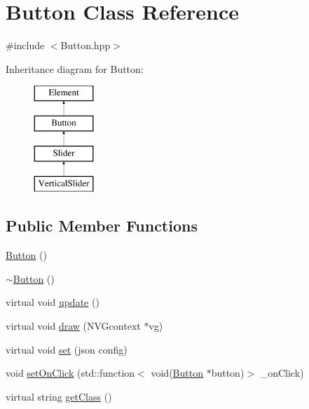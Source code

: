 \hypertarget{class_button}{}\section{Button Class Reference}
\label{class_button}


{\ttfamily \#include $<$Button.\+hpp$>$}

Inheritance diagram for Button\+:\begin{figure}[H]
\begin{center}
\leavevmode
\includegraphics[height=4.000000cm]{class_button}
\end{center}
\end{figure}
\subsection*{Public Member Functions}
\begin{DoxyCompactItemize}
\item 
\hyperlink{class_button_a3b36df1ae23c58aedb9e15a713159459}{Button} ()
\item 
\hyperlink{class_button_a2a001eb9c3cc8ae54768a850dd345002}{$\sim$\+Button} ()
\item 
virtual void \hyperlink{class_button_ad8e030c1c8846d43f3126047d4a3667f}{update} ()
\item 
virtual void \hyperlink{class_button_a3a6ae66dc1ebc663fc12f19ce5cb6840}{draw} (N\+V\+Gcontext $\ast$vg)
\item 
virtual void \hyperlink{class_button_a6e7c3b800fae0b1e7765ccdafc88c28e}{set} (json config)
\item 
void \hyperlink{class_button_a0e4d6981ae08afd292ffa9a9f01939df}{set\+On\+Click} (std\+::function$<$ void(\hyperlink{class_button}{Button} $\ast$button)$>$ \+\_\+on\+Click)
\item 
virtual string \hyperlink{class_button_ad22978c530f78e58cb213436b24b37c0}{get\+Class} ()
\end{DoxyCompactItemize}
